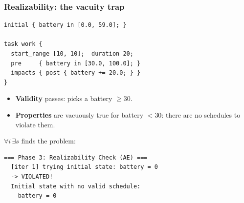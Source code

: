 \begin{frame}[fragile]
  \frametitle{Realizability: the vacuity trap} \small

\begin{lstlisting}
initial { battery in [0.0, 59.0]; }

task work {
  start_range [10, 10];  duration 20;
  pre     { battery in [30.0, 100.0]; }
  impacts { post { battery += 20.0; } }
}
\end{lstlisting}

\begin{itemize}
\item {\bf Validity} passes: \zthree{} picks a battery $\ge 30$.
\item {\bf Properties} are vacuously true for battery $< 30$: there are no schedules to violate them.
\end{itemize}

\pause
\vspace{0.1cm}
$\forall i\, \exists s$ finds the problem:

\begin{lstlisting}[style=shell]
=== Phase 3: Realizability Check (AE) ===
  [iter 1] trying initial state: battery = 0
  -> VIOLATED!
  Initial state with no valid schedule:
    battery = 0
\end{lstlisting}

\end{frame}

